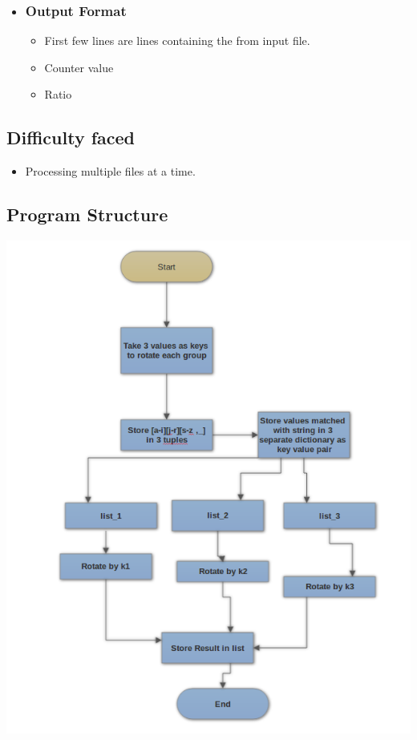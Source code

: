 \documentclass[11pt]{article}
\begin{document}
{{{\begin{itemize}
\item \subsubsection{Output Format}
\begin{itemize}
\item First few lines are lines containing the from input file.
\item Counter value
\item Ratio
\end{itemize}
\end{itemize}


}

\subsection{Difficulty faced}
{
\begin{itemize}
\item Processing multiple files at a time.
\end{itemize}
}

\newpage
\subsection{Program Structure}
\begin{center}
\includegraphics[scale=0.60]{fc2.png}
\end{center}
\newpage

}}
\end{document}

